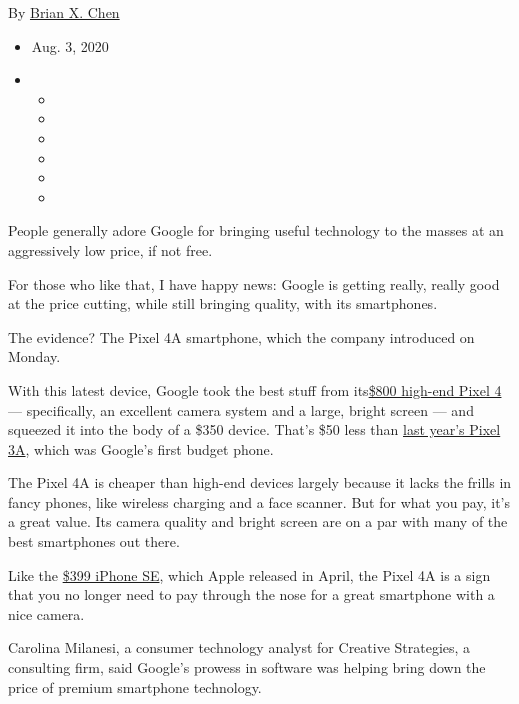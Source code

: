 By \href{https://www.nytimes3xbfgragh.onion/by/brian-x-chen}{Brian X.
Chen}

\begin{itemize}
\item
  Aug. 3, 2020
\item
  \begin{itemize}
  \item
  \item
  \item
  \item
  \item
  \item
  \end{itemize}
\end{itemize}

People generally adore Google for bringing useful technology to the
masses at an aggressively low price, if not free.

For those who like that, I have happy news: Google is getting really,
really good at the price cutting, while still bringing quality, with its
smartphones.

The evidence? The Pixel 4A smartphone, which the company introduced on
Monday.

With this latest device, Google took the best stuff from
its\href{https://www.nytimes3xbfgragh.onion/2019/10/21/technology/personaltech/pixel-4-review.html}{\$800
high-end Pixel 4} --- specifically, an excellent camera system and a
large, bright screen --- and squeezed it into the body of a \$350
device. That's \$50 less than
\href{https://www.nytimes3xbfgragh.onion/2019/05/07/technology/personaltech/pixel-3a.html}{last
year's Pixel 3A}, which was Google's first budget phone.

The Pixel 4A is cheaper than high-end devices largely because it lacks
the frills in fancy phones, like wireless charging and a face scanner.
But for what you pay, it's a great value. Its camera quality and bright
screen are on a par with many of the best smartphones out there.

Like the
\href{https://www.nytimes3xbfgragh.onion/2020/05/06/technology/personaltech/apple-iphone-se-review.html}{\$399
iPhone SE}, which Apple released in April, the Pixel 4A is a sign that
you no longer need to pay through the nose for a great smartphone with a
nice camera.

Carolina Milanesi, a consumer technology analyst for Creative
Strategies, a consulting firm, said Google's prowess in software was
helping bring down the price of premium smartphone technology.

